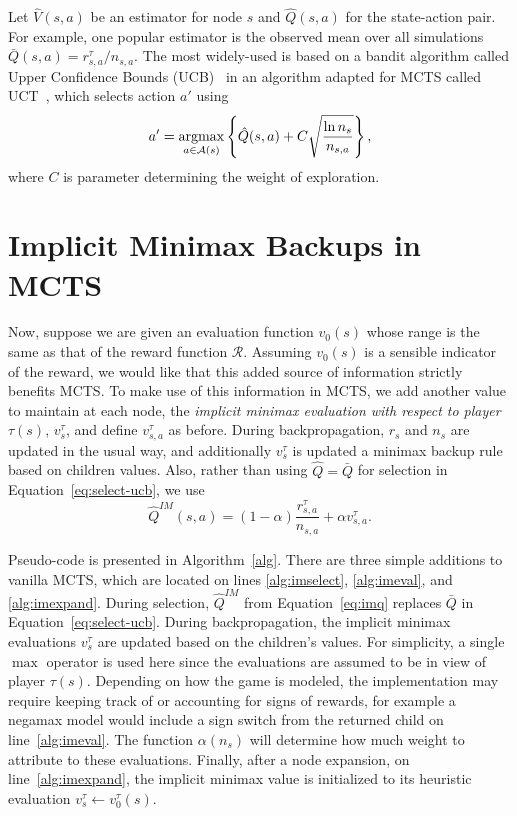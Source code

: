 \documentclass[letterpaper]{article}
\newcommand{\argmax}{\operatornamewithlimits{argmax}}
\newcommand{\bQ}{\bar{Q}}
\newcommand{\cA}{\mathcal{A}}
\newcommand{\cR}{\mathcal{R}}
\newcommand{\hQ}{\hat{Q}}
\newcommand{\hV}{\hat{V}}
\begin{document}
Let $\hV(s,a)$ be an estimator for node $s$ and $\hQ(s,a)$ for the state-action pair. 
For example, one popular estimator is the observed mean over all simulations 
$\bQ(s,a) = r^{\tau}_{s,a} / n_{s,a}$. 
The most widely-used is based on a bandit algorithm called Upper Confidence Bounds (UCB)~\cite{Auer02Finite} in an algorithm adapted 
for MCTS called UCT~\cite{Kocsis06Bandit}, which selects action $a'$ using
\begin{equation}
\label{eq:select-ucb}
a' = \argmax_{a \in \cA(s)} \left\{ \hQ(s,a) + C \sqrt{\frac{\ln n_s}{n_{s,a}}} \right\}, 
\end{equation}
where $C$ is parameter determining the weight of exploration. 

\section{Implicit Minimax Backups in MCTS}

Now, suppose we are given an evaluation function $v_0(s)$ whose range is the same as that of the reward function $\cR$. 
Assuming $v_0(s)$ is a sensible indicator of the reward, we would like that this added source of information
strictly benefits MCTS. 
To make use of this information in MCTS, we add another value to maintain at each node, the 
{\it implicit minimax evaluation with respect to player} $\tau(s)$, $v^{\tau}_s$, and define $v^{\tau}_{s,a}$ as before. 
During backpropagation, $r_s$ and $n_s$ are updated in the usual way, and additionally $v^{\tau}_s$ is updated a minimax backup 
rule based on children values. Also, rather than using $\hQ = \bQ$ for selection in Equation~\ref{eq:select-ucb}, we use
\begin{equation}
\label{eq:imq}
\hQ^{\mathit{IM}}(s,a) = (1-\alpha) \frac{r^{\tau}_{s,a}}{n_{s,a}} + \alpha v^{\tau}_{s,a}.
\end{equation}

Pseudo-code is presented in Algorithm~\ref{alg}. There are three simple additions to vanilla MCTS,
which are located on lines \ref{alg:imselect}, \ref{alg:imeval}, and \ref{alg:imexpand}.
During selection, $\hQ^{\mathit{IM}}$ from Equation~\ref{eq:imq} replaces $\bQ$ in 
Equation~\ref{eq:select-ucb}. During backpropagation, the implicit minimax evaluations $v^{\tau}_s$ are updated based on 
the children's values. For simplicity, a single $\max$ operator is used here since the evaluations are assumed to be in 
view of player $\tau(s)$. Depending on how the game is modeled, the implementation may require keeping track of or  
accounting for signs of rewards, for example a negamax model would include a sign switch from the returned child on 
line~\ref{alg:imeval}. 
The function $\alpha(n_s)$ will determine how much weight to attribute to these evaluations.  
Finally, after a node expansion, on line~\ref{alg:imexpand}, the implicit minimax value is initialized to its heuristic
evaluation $v^{\tau}_s \leftarrow v^{\tau}_0(s)$. 
\end{document}
